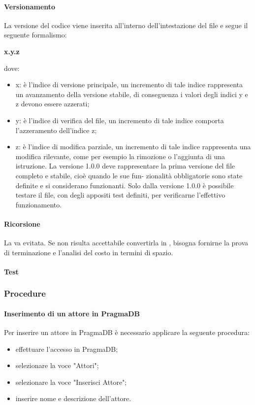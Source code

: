  \paragraph{Versionamento}
 La versione del codice viene inserita all’interno dell’intestazione del file e segue il seguente formalismo:\\
 \centerline{\textbf{x.y.z}} dove:
  \begin{itemize}
 	\item x: è l’indice di versione principale, un incremento di tale indice rappresenta un avanzamento
 	della versione stabile, di conseguenza i valori degli indici y e z devono essere azzerati;
 	\item y: è l’indice di verifica del file, un incremento di tale indice comporta l’azzeramento
 	dell’indice z;
 	\item z: è l’indice di modifica parziale, un incremento di tale indice rappresenta una modifica
 	rilevante, come per esempio la rimozione o l’aggiunta di una istruzione. La versione 1.0.0
 	deve rappresentare la prima versione del file completo e stabile, cioè quando le sue fun-
 	zionalità obbligatorie sono state definite e si considerano funzionanti. Solo dalla versione
 	1.0.0 è possibile testare il file, con degli appositi test definiti, per verificarne l’effettivo
 	funzionamento.
 \end{itemize}
 \paragraph{Ricorsione}
 La  va evitata. Se non risulta accettabile convertirla in , bisogna fornirne la prova di terminazione e l'analisi del costo in termini di spazio.
 \paragraph{Test}
 \subsubsection{Procedure}
 \paragraph{Inserimento di un attore in PragmaDB}
 Per inserire un attore in PragmaDB è necessario applicare la seguente procedura:
 \begin{itemize}
 	\item effettuare l'accesso in PragmaDB;
 	\item selezionare la voce "Attori";
 	\item selezionare la voce "Inserisci Attore";
 	\item inserire nome e descrizione dell'attore.
 \end{itemize}
